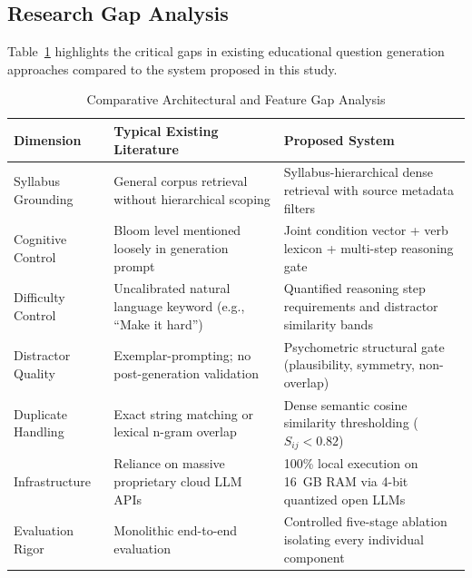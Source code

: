 \documentclass[conference]{IEEEtran}
\begin{document}
\subsection{Research Gap Analysis}
Table~\ref{tab:gap_analysis} highlights the critical gaps in existing educational question generation approaches compared to the system proposed in this study.

\begin{table}[t]
\caption{Comparative Architectural and Feature Gap Analysis}
\label{tab:gap_analysis}
\centering
\small
\begin{tabular}{@{}p{3.2cm}p{6.8cm}p{6.8cm}@{}}
\toprule
\textbf{Dimension} & \textbf{Typical Existing Literature} & \textbf{Proposed System} \\ \midrule
Syllabus Grounding & General corpus retrieval without hierarchical scoping & Syllabus-hierarchical dense retrieval with source metadata filters \\
Cognitive Control & Bloom level mentioned loosely in generation prompt & Joint condition vector + verb lexicon + multi-step reasoning gate \\
Difficulty Control & Uncalibrated natural language keyword (e.g., ``Make it hard'') & Quantified reasoning step requirements and distractor similarity bands \\
Distractor Quality & Exemplar-prompting; no post-generation validation & Psychometric structural gate (plausibility, symmetry, non-overlap) \\
Duplicate Handling & Exact string matching or lexical n-gram overlap & Dense semantic cosine similarity thresholding ($S_{ij} < 0.82$) \\
Infrastructure & Reliance on massive proprietary cloud LLM APIs & 100\% local execution on 16~GB RAM via 4-bit quantized open LLMs \\
Evaluation Rigor & Monolithic end-to-end evaluation & Controlled five-stage ablation isolating every individual component \\ \bottomrule
\end{tabular}
\end{table}
\end{document}
